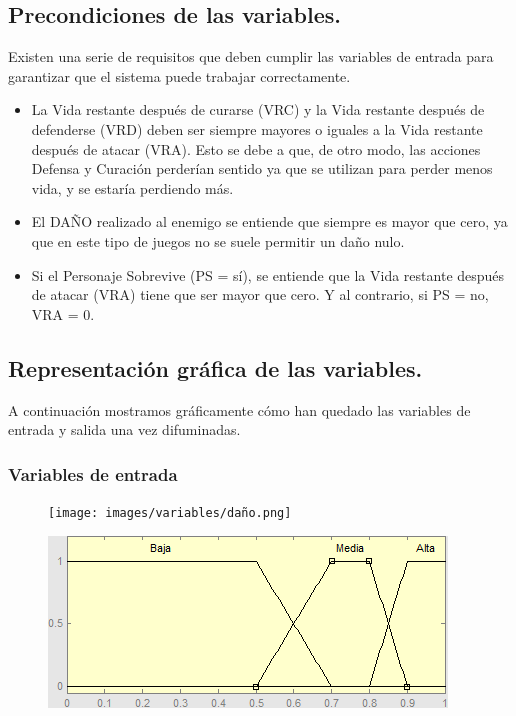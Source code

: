 \subsection{Precondiciones de las variables.}
Existen una serie de requisitos que deben cumplir las variables de entrada para garantizar que el sistema puede trabajar correctamente.
\begin{itemize}
	\item La Vida restante después de curarse (VRC) y la Vida restante después de defenderse (VRD) deben ser siempre mayores o iguales a la Vida restante después de atacar (VRA). Esto se debe a que, de otro modo, las acciones Defensa y Curación perderían sentido ya que se utilizan para perder menos vida, y se estaría perdiendo más.
	
	\item El DAÑO realizado al enemigo se entiende que siempre es mayor que cero, ya que en este tipo de juegos no se suele permitir un daño nulo.
	
	\item Si el Personaje Sobrevive (PS = sí), se entiende que la Vida restante después de atacar (VRA) tiene que ser mayor que cero. Y al contrario, si PS = no, VRA = 0.
	
\end{itemize}



\subsection{Representación gráfica de las variables.}
A continuación mostramos gráficamente cómo han quedado las variables de entrada y salida una vez difuminadas.
\subsubsection{Variables de entrada}
\begin{figure}[H]
	\centering
	\begin{minipage}{.5\textwidth}
		\centering
		\texttt{[image: images/variables/daño.png]}
	\end{minipage}%
	\begin{minipage}{.5\textwidth}
		\centering
		\includegraphics[scale=0.67]{images/variables/pa.png}
	\end{minipage}
\end{figure}

